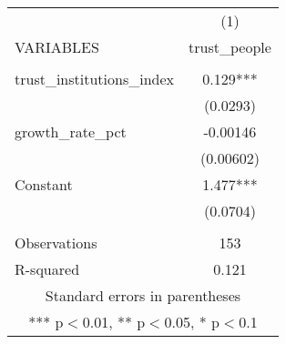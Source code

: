 \documentclass[]{article}
\begin{document}
\begin{tabular}{lc} \hline
 & (1) \\
VARIABLES & trust\_people \\ \hline
 &  \\
trust\_institutions\_index & 0.129*** \\
 & (0.0293) \\
growth\_rate\_pct & -0.00146 \\
 & (0.00602) \\
Constant & 1.477*** \\
 & (0.0704) \\
 &  \\
Observations & 153 \\
 R-squared & 0.121 \\ \hline
\multicolumn{2}{c}{ Standard errors in parentheses} \\
\multicolumn{2}{c}{ *** p$<$0.01, ** p$<$0.05, * p$<$0.1} \\
\end{tabular}
\end{document}
